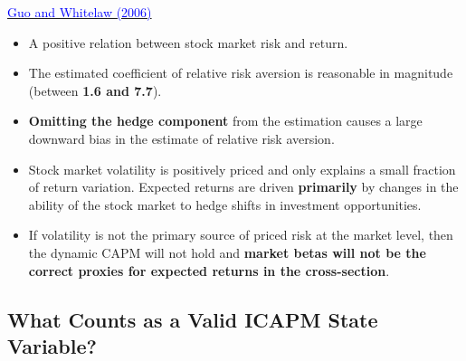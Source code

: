 \documentclass{beamer}
\begin{document}
\begin{frame}{\href{https://doi.org/10.1111/j.1540-6261.2006.00877.x}{\textcolor{blue}{Guo and Whitelaw (2006)}}}
	\begin{itemize}
		\item A positive relation between stock market risk and return.
		\item The estimated coefficient of relative risk aversion is reasonable in magnitude (between \textbf{1.6 and 7.7}).
		\item \textbf{Omitting the hedge component} from the estimation causes a large downward bias in the estimate of relative risk aversion.
		\item Stock market volatility is positively priced and only
		explains a small fraction of return variation. Expected returns are driven \textbf{primarily} by changes in the ability of the stock market to hedge shifts in investment opportunities.
		\item If volatility is not the primary source of priced risk at the market level, then the dynamic CAPM will not hold and \textbf{market betas will not be the correct proxies
		for expected returns in the cross-section}.
	\end{itemize}
\end{frame}

\subsection{What Counts as a Valid ICAPM State Variable?}
\end{document}
